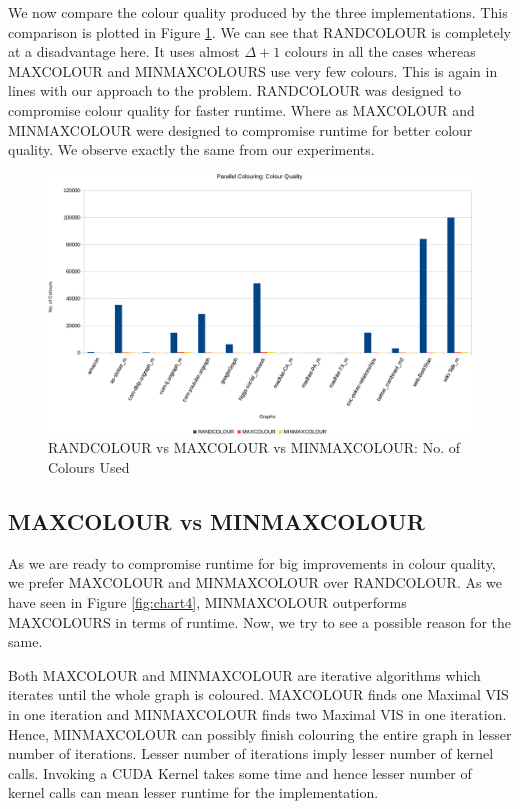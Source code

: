 \documentclass[MTech]{iitmdiss}
\begin{document}
We now compare the colour quality produced by the three implementations. This comparison is plotted in Figure \ref{fig:chart5}. We can see that RANDCOLOUR is completely at a disadvantage here. It uses almost $\Delta+1$ colours in all the cases whereas MAXCOLOUR and MINMAXCOLOURS use very few colours. This is again in lines with our approach to the problem. RANDCOLOUR was designed to compromise colour quality for faster runtime. Where as MAXCOLOUR and MINMAXCOLOUR were designed to compromise runtime for better colour quality. We observe exactly the same from our experiments.

\begin{figure}[h]
    \centering
    \includegraphics[width=\textwidth,keepaspectratio=true]{chartNewest5.pdf}
    \caption{
        RANDCOLOUR vs MAXCOLOUR vs MINMAXCOLOUR: No. of Colours Used
    }
    \label{fig:chart5}
\end{figure}

\subsection{MAXCOLOUR vs MINMAXCOLOUR}
As we are ready to compromise runtime for big improvements in colour quality, we prefer MAXCOLOUR and MINMAXCOLOUR over RANDCOLOUR. As we have seen in Figure \ref{fig:chart4}, MINMAXCOLOUR outperforms MAXCOLOURS in terms of runtime. Now, we try to see a possible reason for the same.

Both MAXCOLOUR and MINMAXCOLOUR are iterative algorithms which iterates until the whole graph is coloured. MAXCOLOUR finds one Maximal VIS in one iteration and MINMAXCOLOUR finds two Maximal VIS in one iteration. Hence, MINMAXCOLOUR can possibly finish colouring the entire graph in lesser number of iterations. Lesser number of iterations imply lesser number of kernel calls. Invoking a CUDA Kernel takes some time and hence lesser number of kernel calls can mean lesser runtime for the implementation.
\end{document}
